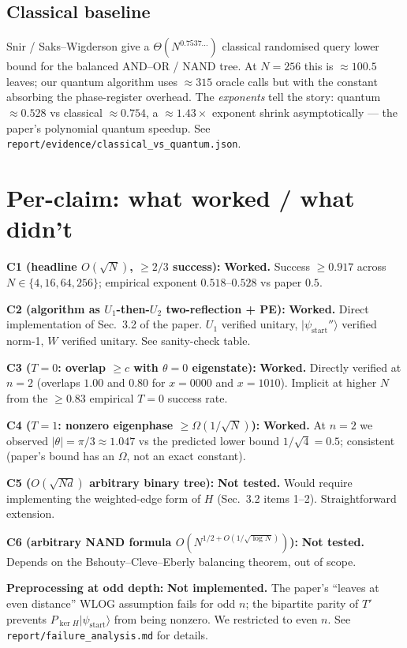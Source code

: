 \documentclass[11pt]{article}
\begin{document}
\subsection{Classical baseline}
Snir / Saks--Wigderson give a $\Theta(N^{0.7537...})$ classical randomised query lower bound
for the balanced AND--OR / NAND tree. At $N=256$ this is $\approx 100.5$ leaves; our quantum
algorithm uses $\approx 315$ oracle calls but with the constant absorbing the phase-register
overhead. The \emph{exponents} tell the story: quantum $\approx 0.528$ vs classical $\approx 0.754$,
a $\approx 1.43\times$ exponent shrink asymptotically --- the paper's polynomial quantum speedup.
See \texttt{report/evidence/classical\_vs\_quantum.json}.

\section{Per-claim: what worked / what didn't}

\textbf{C1 (headline $O(\sqrt N)$, $\ge 2/3$ success):} \textbf{Worked.}
Success $\ge 0.917$ across $N\in\{4,16,64,256\}$; empirical exponent $0.518$--$0.528$ vs paper $0.5$.

\textbf{C2 (algorithm as $U_1$-then-$U_2$ two-reflection + PE):} \textbf{Worked.}
Direct implementation of Sec.~3.2 of the paper. $U_1$ verified unitary, $|\psi_{\text{start}}''\rangle$
verified norm-1, $W$ verified unitary. See sanity-check table.

\textbf{C3 ($T=0$: overlap $\ge c$ with $\theta{=}0$ eigenstate):} \textbf{Worked.}
Directly verified at $n=2$ (overlaps $1.00$ and $0.80$ for $x{=}0000$ and $x{=}1010$).
Implicit at higher $N$ from the $\ge 0.83$ empirical $T{=}0$ success rate.

\textbf{C4 ($T=1$: nonzero eigenphase $\ge \Omega(1/\sqrt N)$):} \textbf{Worked.}
At $n=2$ we observed $|\theta| = \pi/3 \approx 1.047$ vs the predicted lower bound $1/\sqrt 4 = 0.5$;
consistent (paper's bound has an $\Omega$, not an exact constant).

\textbf{C5 ($O(\sqrt{Nd})$ arbitrary binary tree):} \textbf{Not tested.} Would require
implementing the weighted-edge form of $H$ (Sec.~3.2 items 1--2). Straightforward extension.

\textbf{C6 (arbitrary NAND formula $O(N^{1/2 + O(1/\sqrt{\log N})})$):} \textbf{Not tested.}
Depends on the Bshouty--Cleve--Eberly balancing theorem, out of scope.

\textbf{Preprocessing at odd depth:} \textbf{Not implemented.} The paper's ``leaves at even
distance'' WLOG assumption fails for odd $n$; the bipartite parity of $T'$ prevents
$P_{\ker H}|\psi_{\text{start}}\rangle$ from being nonzero. We restricted to even $n$.
See \texttt{report/failure\_analysis.md} for details.
\end{document}
